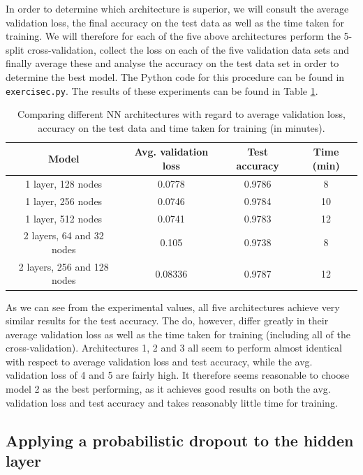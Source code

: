 \documentclass[12pt]{article}
\newcommand{\exercisec}{\texttt{exercisec.py}\;}
\begin{document}
In order to determine which architecture is superior, we will consult the average validation loss, the final accuracy on the test data as well as the time taken for training. We will therefore for each of the five above architectures perform the 5-split cross-validation, collect the loss on each of the five validation data sets and finally average these and analyse the accuracy on the test data set in order to determine the best model. The Python code for this procedure can be found in \exercisec. The results of these experiments can be found in Table \ref{tab:exercisec}. 

\begin{table}[ht]
    \centering
    \begin{tabular}{c|c|c|c}
        \textbf{Model}              & \textbf{Avg. validation loss} & \textbf{Test accuracy} & \textbf{Time (min)} \\ \hline
        1 layer, 128 nodes  &   0.0778 &    0.9786 & 8 \\
        1 layer, 256 nodes  & 0.0746 & 0.9784  & 10   \\
        1 layer, 512 nodes  & 0.0741 & 0.9783 & 12 \\
        2 layers, 64 and 32 nodes   & 0.105 &    0.9738 & 8\\
        2 layers, 256 and 128 nodes & 0.08336 &   0.9787 & 12 
    \end{tabular}
     \caption{Comparing different NN architectures with regard to average validation loss, accuracy on the test data and time taken for training (in minutes).}
        \label{tab:exercisec}
\end{table}

As we can see from the experimental values, all five architectures achieve very similar results for the test accuracy. The do, however, differ greatly in their average validation loss as well as the time taken for training (including all of the cross-validation). Architectures 1, 2 and 3 all seem to perform almost identical with respect to average validation loss and test accuracy, while the avg. validation loss of 4 and 5 are fairly high. It therefore seems reasonable to choose model 2 as the best performing, as it achieves good results on both the avg. validation loss and test accuracy and takes reasonably little time for training. 


\subsection{Applying a probabilistic dropout to the hidden layer}
\end{document}
